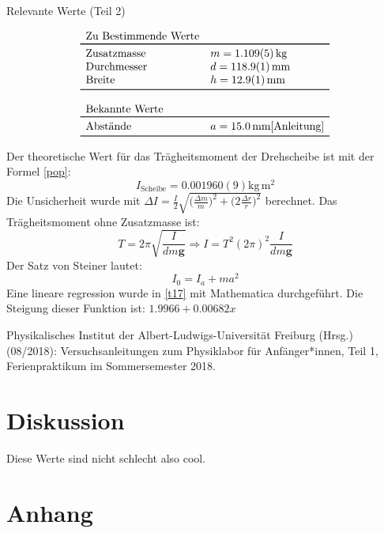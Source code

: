 \documentclass[11pt,a4paper]{article}
\renewcommand{\vec}{\boldsymbol}
\begin{document}
\begin{table}[ht]
\caption{Relevante Werte (Teil 2)}
$$
\begin{array}{ll}
	\multicolumn{1}{l}{\textrm{Zu Bestimmende Werte}} \\
	\toprule 
	\textrm{Zusatzmasse} & m = 1.109(5)\,\textrm{kg} \\
	\textrm{Durchmesser} & d = 118.9(1)\,\textrm{mm} \\
	\textrm{Breite} & h = 12.9(1)\,\textrm{mm} \\
	\bottomrule \\
	\multicolumn{2}{l}{\textrm{Bekannte Werte}} \\
	\toprule
	\textrm{Abstände} & a = 15.0\,\textrm{mm}\cite{Anleitung}\\
	\bottomrule 
\end{array}
$$
\end{table}
Der theoretische Wert für das Trägheitsmoment der Drehscheibe ist mit der Formel \ref{pop}:
$$I_{\textrm{Scheibe}} = 0.001960(9)\textrm{kg}\,\textrm{m}^2$$
Die Unsicherheit wurde mit $\Delta I = \frac{I}{2}\sqrt{\bigg(\frac{\Delta m}{m}\bigg)^2 + \bigg(2\frac{\Delta r}{r}\bigg)^2}$ berechnet. 
Das Trägheitsmoment ohne Zusatzmasse ist:
$$T = 2\pi \sqrt{\frac{I}{dm\vec{g}}} \Rightarrow I = T^2 (2\pi)^2 \frac{I}{dm\vec{g}}$$
Der Satz von Steiner lautet:
$$I_0 = I_a + ma^2$$
Eine lineare regression wurde in \ref{t17} mit Mathematica durchgeführt. Die Steigung dieser Funktion ist: $1.9966 + 0.00682 x$ 

\vfill

\begin{thebibliography}{9}
  Physikalisches Institut der Albert-Ludwigs-Universität Freiburg (Hrsg.) (08/2018): Versuchsanleitungen zum Physiklabor für Anfänger*innen, Teil 1, Ferienpraktikum im Sommersemester 2018.
 \end{thebibliography}

\pagebreak

\section{Diskussion}

Diese Werte sind nicht schlecht also cool.

\section{Anhang}
\end{document}
